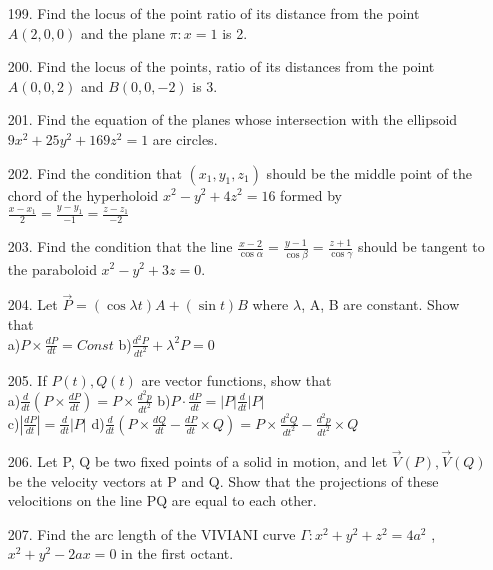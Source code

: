 \documentclass[11pt]{amsbook}
\begin{document}
	\begin{enumerate}
		\item[199.]
			Find the locus of the point ratio of its distance from the point $A(2, 0, 0)$ and the plane $\pi : x = 1$ is 2.

    	\item[200.]
    		Find the locus of the points, ratio of its distances from the point $A(0, 0, 2)$ and $B(0, 0, -2)$ is 3.

    	\item[201.]
    		Find the equation of the planes whose intersection with the ellipsoid $9x^2 + 25y^2 + 169z^2 = 1$ are circles.
    	
		\item[202.]
			Find the condition that $(x_1, y_1, z_1)$ should be the middle point of the chord of the hyperholoid $x^2 - y^2 + 4z^2 = 16$ formed by \\
			$\frac{x-x_1}{2} = \frac{y-y_1}{-1} = \frac{z-z_1}{-2}$

    	\item[203.]
    		Find the condition that the line $\frac{x-2}{\cos \alpha} = \frac{y-1}{\cos \beta} = \frac{z+1}{\cos \gamma}$ should be tangent to the paraboloid $x^2-y^2+3z = 0$.

		\item[204.]
			Let $\vec{P} = (\cos \lambda t)A + (\sin t)B$ where $\lambda$, A, B are constant. Show that\\
			a)$P \times \frac{dP}{dt} = Const$
			b)$\frac{d^2 P}{dt^2} + \lambda^2 P = 0$

		\item[205.]
			If $P(t), Q(t)$ are vector functions, show that\\
			a)$\frac{d}{dt}(P \times \frac{dP}{dt}) = P \times \frac{d^2p}{dt^2}$
			b)$P \cdot \frac{dP}{dt} = |P| \frac{d}{dt}|P|$\\
			c)$|\frac{dP}{dt}| = \frac{d}{dt}|P|$
			d)$\frac{d}{dt} (P \times \frac{dQ}{dt} - \frac{dP}{dt} \times Q) = P \times \frac{d^2 Q}{dt^2} - \frac{d^2p}{dt^2} \times Q$

		\item[206.]
			Let P, Q be two fixed points of a solid in motion, and let $\vec{V}(P), \vec{V}(Q)$ be the velocity vectors at P and Q. Show that the projections of these velocitions on the line PQ are equal to each other.

		\item[207.]
			Find the arc length of the VIVIANI curve $\Gamma : x^2 + y^2 + z^2 = 4a^2$ , $x^2 + y^2 - 2ax = 0$ in the first octant.
		
	\end{enumerate}
\end{document}
